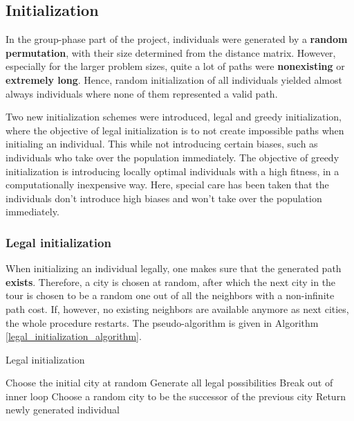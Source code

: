 \documentclass[a4paper,10pt]{article}
\begin{document}
\subsection{Initialization}
\label{initialization}
In the group-phase part of the project, individuals were generated by a \textbf{random permutation}, with their size determined from the distance matrix. However, especially for the larger problem sizes, quite a lot of paths were \textbf{nonexisting} or \textbf{extremely long}. Hence, random initialization of all individuals yielded almost always individuals where none of them represented a valid path. 

Two new initialization schemes were introduced, legal and greedy initialization, where the objective of legal initialization is to not create impossible paths when initialing an individual. This while not introducing certain biases, such as individuals who take over the population immediately. The objective of greedy initialization is introducing locally optimal individuals with a high fitness, in a computationally inexpensive way. Here, special care has been taken that the individuals don't introduce high biases and won't take over the population immediately.

\subsubsection{Legal initialization}
When initializing an individual legally, one makes sure that the generated path \textbf{exists}. Therefore, a city is chosen at random, after which the next city in the tour is chosen to be a random one out of all the neighbors with a non-infinite path cost. If, however, no existing neighbors are available anymore as next cities, the whole procedure restarts. The pseudo-algorithm is given in Algorithm \ref{legal_initialization_algorithm}.

\begin{algorithm}
\caption{Legal initialization}\label{legal_initialization_algorithm}
\begin{algorithmic}
\State Choose the initial city at random
\State Generate all legal possibilities
\State Break out of inner loop
\EndIf
\State Choose a random city to be the successor of the previous city
\EndWhile
{}
\State Return newly generated individual
\EndIf
\EndWhile
\end{algorithmic}
\end{algorithm}
\end{document}
